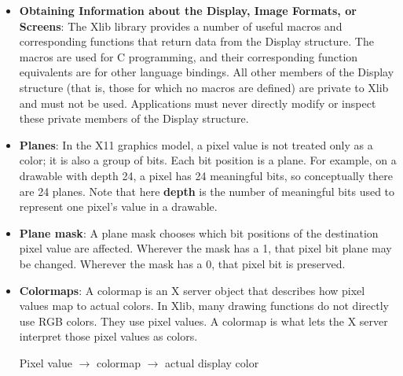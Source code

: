 \documentclass{report}
\begin{document}
\begin{itemize}
            \bigbreak \noindent 
            If successful, \textbf{XOpenDisplay} returns a pointer to a \textbf{Display} structure, which is defined in \textbf{<X11/Xlib.h>.} If \textbf{XOpenDisplay} does not succeed, it returns NULL. After a successful call to \textbf{XOpenDisplay,} all of the screens in the display can be used by the client. The screen number specified in the display\_name argument is returned by the \textbf{DefaultScreen} macro (or the \textbf{XDefaultScreen} function). You can access elements of the \textbf{Display} and \textbf{Screen} structures only by using the information macros or functions.
        \item \textbf{Obtaining Information about the Display, Image Formats, or Screens}: The Xlib library provides a number of useful macros and corresponding functions that return data from the Display structure. The macros are used for C programming, and their corresponding function equivalents are for other language bindings.
            \bigbreak \noindent 
            All other members of the Display structure (that is, those for which no macros are defined) are private to Xlib and must not be used. Applications must never directly modify or inspect these private members of the Display structure.
        \item \textbf{Planes}: In the X11 graphics model, a pixel value is not treated only as a color; it is also a group of bits. Each bit position is a plane. For example, on a drawable with depth 24, a pixel has 24 meaningful bits, so conceptually there are 24 planes.
            \bigbreak \noindent 
            Note that here \textbf{depth} is the number of meaningful bits used to represent one pixel’s value in a drawable.
        \item \textbf{Plane mask}: A plane mask chooses which bit positions of the destination pixel value are affected.
            \bigbreak \noindent 
            Wherever the mask has a 1, that pixel bit plane may be changed. Wherever the mask has a 0, that pixel bit is preserved.
        \item \textbf{Colormaps}: A colormap is an X server object that describes how pixel values map to actual colors. In Xlib, many drawing functions do not directly use RGB colors. They use pixel values. A colormap is what lets the X server interpret those pixel values as colors.
            \begin{center}
                Pixel value $\to$ colormap $\to$ actual display color
            \end{center}

\end{itemize}
\end{document}
